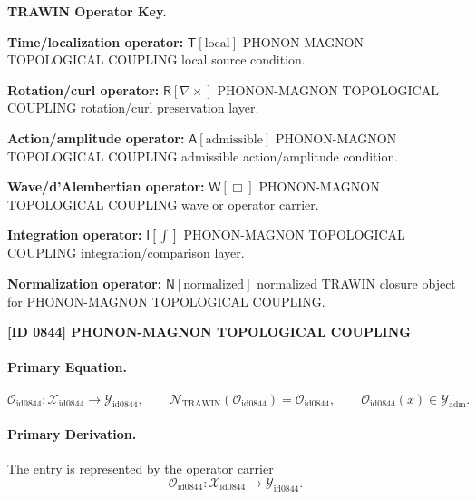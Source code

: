\par\vspace{0.45\baselineskip}
\noindent\begin{minipage}[t]{\linewidth}
\begingroup
\small
\raggedright
\textbf{TRAWIN Operator Key.}\par
\noindent\textbf{Time/localization operator:} $\mathsf{T}\!\left[\mathrm{local}\right]$ PHONON-MAGNON TOPOLOGICAL COUPLING local source condition.\par
\noindent\textbf{Rotation/curl operator:} $\mathsf{R}\!\left[\nabla\times\right]$ PHONON-MAGNON TOPOLOGICAL COUPLING rotation/curl preservation layer.\par
\noindent\textbf{Action/amplitude operator:} $\mathsf{A}\!\left[\mathrm{admissible}\right]$ PHONON-MAGNON TOPOLOGICAL COUPLING admissible action/amplitude condition.\par
\noindent\textbf{Wave/d'Alembertian operator:} $\mathsf{W}\!\left[\Box\right]$ PHONON-MAGNON TOPOLOGICAL COUPLING wave or operator carrier.\par
\noindent\textbf{Integration operator:} $\mathsf{I}\!\left[\int\right]$ PHONON-MAGNON TOPOLOGICAL COUPLING integration/comparison layer.\par
\noindent\textbf{Normalization operator:} $\mathsf{N}\!\left[\mathrm{normalized}\right]$ normalized TRAWIN closure object for PHONON-MAGNON TOPOLOGICAL COUPLING.\par
\endgroup
\end{minipage}

\clearpage
\noindent\textbf{[ID 0844] PHONON-MAGNON TOPOLOGICAL COUPLING}\par
\vspace{0.35em}
\paragraph{Primary Equation.}
\[
\mathcal{O}_{\mathrm{id0844}}:\mathcal{X}_{\mathrm{id0844}}\longrightarrow \mathcal{Y}_{\mathrm{id0844}},\qquad
\mathcal{N}_{\mathrm{TRAWIN}}(\mathcal{O}_{\mathrm{id0844}})=\mathcal{O}_{\mathrm{id0844}},\qquad
\mathcal{O}_{\mathrm{id0844}}(x)\in\mathcal{Y}_{\mathrm{adm}}.
\]

\paragraph{Primary Derivation.} The entry is represented by the operator carrier\[
\mathcal{O}_{\mathrm{id0844}}:\mathcal{X}_{\mathrm{id0844}}\longrightarrow \mathcal{Y}_{\mathrm{id0844}}.
\]

